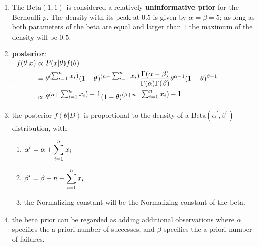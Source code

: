 \begin{enumerate}
    \item  The $\text{Beta}(1,1)$ is considered a relatively \textbf{uninformative prior} for the Bernoulli $p$.
    The density with its peak at $0.5$ is given by $\alpha = \beta = 5$; as long as both parameters of the beta are equal and larger than $1$ the maximum of the density will be $0.5$. 
    \hfill \cite{statistics/book/Statistics-for-Data-Scientists/Maurits-Kaptein}

    \item \textbf{posterior}:
    \hfill \cite{statistics/book/Statistics-for-Data-Scientists/Maurits-Kaptein}
    \\[0.2cm]
    .\hfill
    $
        \begin{aligned}
            f (\theta|x) 
            &\propto P(x|\theta) f (\theta) \\
            &= \theta^{(\textstyle\sum^n _{i=1} x_i)} (1 - \theta)^{(n-\textstyle\sum^n _{i=1} x _i)} \dfrac{\Gamma (\alpha + \beta) }{\Gamma (\alpha)\Gamma (\beta)} \theta ^{\alpha-1}(1 - \theta)^{\beta-1} \\
            &\propto \theta^{(\alpha+\textstyle\sum^n _{i=1} x _i )-1}(1 - \theta)^{ (\beta+n-\textstyle\sum^n_{ i=1} x_ i )-1}
        \end{aligned}
    $
    \hfill \cite{statistics/book/Statistics-for-Data-Scientists/Maurits-Kaptein}

    \item  the posterior $f (\theta|D)$ is proportional to the density of a $\text{Beta}(\alpha^\prime, \beta^\prime)$ distribution, with
    \hfill \cite{statistics/book/Statistics-for-Data-Scientists/Maurits-Kaptein}
    \begin{enumerate}
        \item $\alpha^\prime = \alpha + \displaystyle\sum^n _{i=1} x_ i$
        \hfill \cite{statistics/book/Statistics-for-Data-Scientists/Maurits-Kaptein}

        \item $\beta^\prime = \beta + n - \displaystyle\sum^n _{i=1} x_ i$ 
        \hfill \cite{statistics/book/Statistics-for-Data-Scientists/Maurits-Kaptein}

        \item the Normalizing constant will be the Normalizing constant of the beta.
        \hfill \cite{statistics/book/Statistics-for-Data-Scientists/Maurits-Kaptein}
    \end{enumerate}

    \item the beta prior can be regarded as adding additional observations where $\alpha$ specifies the a-priori number of successes, and $\beta$ specifies the a-priori number of failures.
    \hfill \cite{statistics/book/Statistics-for-Data-Scientists/Maurits-Kaptein}
\end{enumerate}














